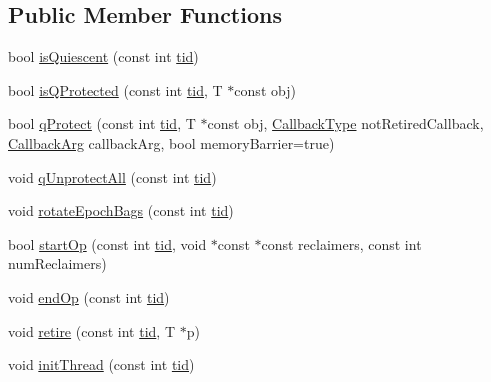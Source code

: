 \subsection*{Public Member Functions}
\begin{DoxyCompactItemize}
\item 
bool \hyperlink{classreclaimer__debraplus_a4cf9fd158f9e1fee5f4e518e69d738ca}{is\+Quiescent} (const int \hyperlink{microbench_2main_8cpp_a9ca9869868fe7e7a38a921cc7de4103f}{tid})
\item 
bool \hyperlink{classreclaimer__debraplus_ab2108aa83328af20d9edefaa6181f829}{is\+Q\+Protected} (const int \hyperlink{microbench_2main_8cpp_a9ca9869868fe7e7a38a921cc7de4103f}{tid}, T $\ast$const obj)
\item 
bool \hyperlink{classreclaimer__debraplus_ad32af3b2be631a1bf8121f3ec92e8c80}{q\+Protect} (const int \hyperlink{microbench_2main_8cpp_a9ca9869868fe7e7a38a921cc7de4103f}{tid}, T $\ast$const obj, \hyperlink{globals_8h_a57f5c0d40b156d7d996492fb2f16e3cd}{Callback\+Type} not\+Retired\+Callback, \hyperlink{globals_8h_a3de64ef48066ac6430631c8b81a15345}{Callback\+Arg} callback\+Arg, bool memory\+Barrier=true)
\item 
void \hyperlink{classreclaimer__debraplus_ace3e4760c51f3035446e3fe0f363e6d5}{q\+Unprotect\+All} (const int \hyperlink{microbench_2main_8cpp_a9ca9869868fe7e7a38a921cc7de4103f}{tid})
\item 
void \hyperlink{classreclaimer__debraplus_abd86bc4bf14e52867a2fc6bdfa4f2887}{rotate\+Epoch\+Bags} (const int \hyperlink{microbench_2main_8cpp_a9ca9869868fe7e7a38a921cc7de4103f}{tid})
\item 
bool \hyperlink{classreclaimer__debraplus_ae6841e2253a106dafc3dfada360afce3}{start\+Op} (const int \hyperlink{microbench_2main_8cpp_a9ca9869868fe7e7a38a921cc7de4103f}{tid}, void $\ast$const $\ast$const reclaimers, const int num\+Reclaimers)
\item 
void \hyperlink{classreclaimer__debraplus_a2c702367af049f905ff76101b340d22f}{end\+Op} (const int \hyperlink{microbench_2main_8cpp_a9ca9869868fe7e7a38a921cc7de4103f}{tid})
\item 
void \hyperlink{classreclaimer__debraplus_ab9e42e9a1a7a78774f46740ba79a5abe}{retire} (const int \hyperlink{microbench_2main_8cpp_a9ca9869868fe7e7a38a921cc7de4103f}{tid}, T $\ast$p)
\item 
void \hyperlink{classreclaimer__debraplus_aa102a69aaf1bc87bbc7dd27b0e5d9c0d}{init\+Thread} (const int \hyperlink{microbench_2main_8cpp_a9ca9869868fe7e7a38a921cc7de4103f}{tid})

\end{DoxyCompactItemize}

